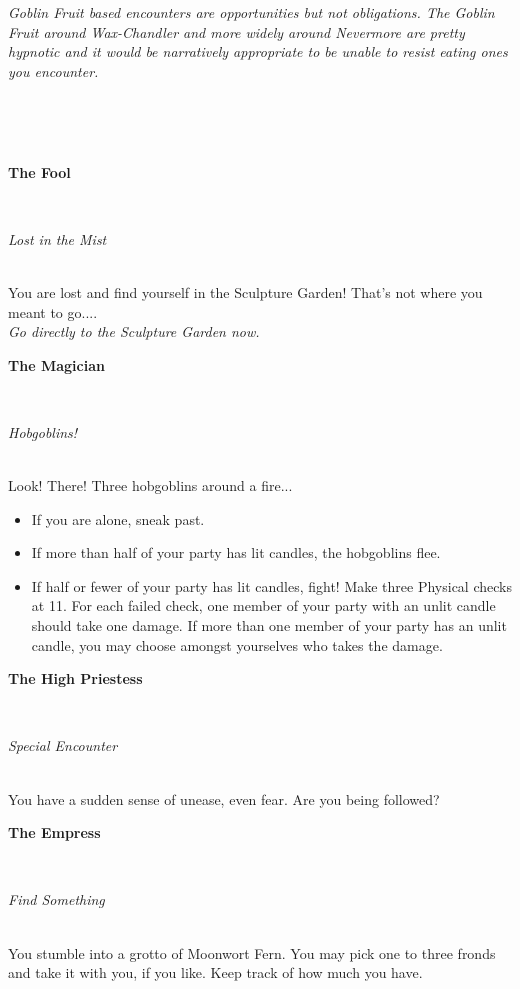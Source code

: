 \documentclass[green]{gl2018}
\begin{document}
\name{\gFog{}}

\emph{Goblin Fruit based encounters are opportunities but not obligations. The Goblin Fruit around Wax-Chandler and more widely around Nevermore are pretty hypnotic and it would be narratively appropriate to be unable to resist eating ones you encounter.}
\newcommand{\areastart}[2]{ \begin{huge}{\bf {#1}} \end{huge} \\ \begin{large} \emph{#2} \end{large}\\}
\newcommand{\hobgoblins}[3]{Look!  There!  #1 hobgoblins around a fire...  

\begin{itemize}
\item If you are alone, sneak past.
\item If more than half of your party has lit candles, the hobgoblins flee.
\item If half or fewer of your party has lit candles, fight!  Make #2 Physical checks at #3.  For each failed check, one member of your party with an unlit candle should take one damage.  If more than one member of your party has an unlit candle, you may choose amongst yourselves who takes the damage.
\end{itemize}}
\newenvironment{location}[2]{\begin{minipage}{\textwidth}\areastart{#1}{#2}}{\end{minipage}\vspace{0.3in}}
\newcommand{\lost}[1]{You are lost and find yourself in #1!  That's not where you meant to go....\\{\em Go directly to #1 now.}}
\begin{location}{\hspace{0.5in}}{ }
\end{location}
\begin{location}{The Fool}{Lost in the Mist}
\lost{the Sculpture Garden}
\end{location}
\begin{location}{The Magician}{Hobgoblins!}
\hobgoblins{Three}{three}{11}
\end{location}
\begin{location}{The High Priestess}{Special Encounter}
You have a sudden sense of unease, even fear.  Are you being followed?
\end{location}
\begin{location}{The Empress}{Find Something}
You stumble into a grotto of Moonwort Fern.  You may pick one to three fronds and take it with you, if you like.  Keep track of how much you have.
\end{location}
\end{document}
